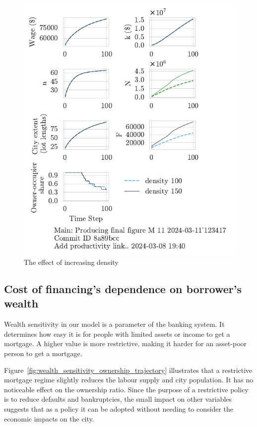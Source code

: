 \begin{figure}[h!bt]
    \centering
    \includegraphics[scale=1, trim={0 1.4cm 0 0},clip]{fig/density-Main-123417.pdf}
    \caption{The effect of increasing density}
    \label{fig:density_ownership_trajectory}
\end{figure}


\newpage
\subsection{Cost of financing's dependence on borrower's wealth}
Wealth sensitivity in our model is a parameter of the banking system. It determines how easy it is for people with limited assets or income to get a mortgage. A higher value is more restrictive,  making it harder for an asset-poor person to get a mortgage.

Figure~\ref{fig:wealth_sensitivity_ownership_trajectory} illustrates that a restrictive mortgage regime slightly reduces the labour supply and city population. It has no noticeable effect on the ownership ratio. Since the purpose of a restrictive policy is to reduce defaults and bankruptcies, the small impact on other variables suggests that as a policy it can be adopted without needing to consider the economic impacts on the city. 

